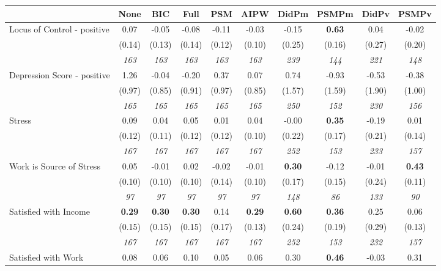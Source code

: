 \begin{tabular}{l c c c c c c c c c}
\toprule
 & None & BIC & Full & PSM & AIPW & DidPm & PSMPm & DidPv & PSMPv \\
\midrule
Locus of Control - positive & 0.07 & -0.05 & -0.08 & -0.11 & -0.03 & -0.15 & \textbf{0.63} & 0.04 & -0.02 \\
& (0.14) & (0.13) & (0.14) & (0.12) & (0.10) & (0.25) & (0.16) & (0.27) & (0.20) \\
& \textit{ 163 } & \textit{ 163 } & \textit{ 163 } & \textit{ 163 } & \textit{ 163 } & \textit{ 239 } & \textit{ 144 } & \textit{ 221 } & \textit{ 148 } \\
Depression Score - positive & 1.26 & -0.04 & -0.20 & 0.37 & 0.07 & 0.74 & -0.93 & -0.53 & -0.38 \\
& (0.97) & (0.85) & (0.91) & (0.97) & (0.85) & (1.57) & (1.59) & (1.90) & (1.00) \\
& \textit{ 165 } & \textit{ 165 } & \textit{ 165 } & \textit{ 165 } & \textit{ 165 } & \textit{ 250 } & \textit{ 152 } & \textit{ 230 } & \textit{ 156 } \\
Stress & 0.09 & 0.04 & 0.05 & 0.01 & 0.04 & -0.00 & \textbf{0.35} & -0.19 & 0.01 \\
& (0.12) & (0.11) & (0.12) & (0.12) & (0.10) & (0.22) & (0.17) & (0.21) & (0.14) \\
& \textit{ 167 } & \textit{ 167 } & \textit{ 167 } & \textit{ 167 } & \textit{ 167 } & \textit{ 252 } & \textit{ 153 } & \textit{ 233 } & \textit{ 157 } \\
Work is Source of Stress & 0.05 & -0.01 & 0.02 & -0.02 & -0.01 & \textbf{ 0.30 } & -0.12 & -0.01 & \textbf{0.43} \\
& (0.10) & (0.10) & (0.10) & (0.14) & (0.10) & (0.17) & (0.15) & (0.24) & (0.11) \\
& \textit{ 97 } & \textit{ 97 } & \textit{ 97 } & \textit{ 97 } & \textit{ 97 } & \textit{ 148 } & \textit{ 86 } & \textit{ 133 } & \textit{ 90 } \\
Satisfied with Income & \textbf{ 0.29 } & \textbf{ 0.30 } & \textbf{ 0.30 } & 0.14 & \textbf{0.29} & \textbf{ 0.60 } & \textbf{0.36} & 0.25 & 0.06 \\
& (0.15) & (0.15) & (0.15) & (0.17) & (0.13) & (0.24) & (0.19) & (0.29) & (0.13) \\
& \textit{ 167 } & \textit{ 167 } & \textit{ 167 } & \textit{ 167 } & \textit{ 167 } & \textit{ 252 } & \textit{ 153 } & \textit{ 232 } & \textit{ 157 } \\
Satisfied with Work & 0.08 & 0.06 & 0.10 & 0.05 & 0.06 & 0.30 & \textbf{0.46} & -0.03 & 0.31 \\

\end{tabular}
